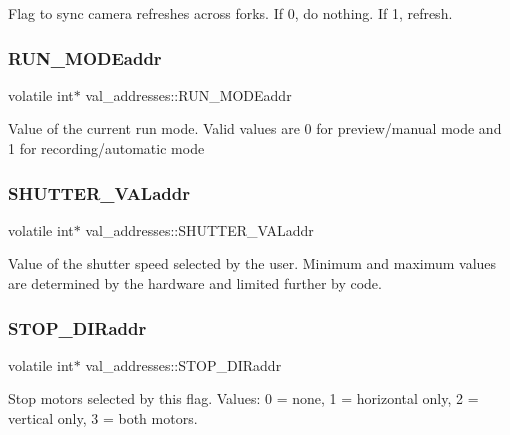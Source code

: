 Flag to sync camera refreshes across forks. If 0, do nothing. If 1, refresh. \mbox{\label{structval__addresses_aae5779146fa4fb188bb9572c20d5da4a}} 
\subsubsection{\texorpdfstring{R\+U\+N\+\_\+\+M\+O\+D\+Eaddr}{RUN\_MODEaddr}}
{\footnotesize\ttfamily volatile int$\ast$ val\+\_\+addresses\+::\+R\+U\+N\+\_\+\+M\+O\+D\+Eaddr}

Value of the current run mode. Valid values are 0 for preview/manual mode and 1 for recording/automatic mode \mbox{\label{structval__addresses_a57ee2cd54ae492b38aae06975b64b0e2}} 
\subsubsection{\texorpdfstring{S\+H\+U\+T\+T\+E\+R\+\_\+\+V\+A\+Laddr}{SHUTTER\_VALaddr}}
{\footnotesize\ttfamily volatile int$\ast$ val\+\_\+addresses\+::\+S\+H\+U\+T\+T\+E\+R\+\_\+\+V\+A\+Laddr}

Value of the shutter speed selected by the user. Minimum and maximum values are determined by the hardware and limited further by code. \mbox{\label{structval__addresses_ae9ae522d433f333dbb15a1ed5ebe70e6}} 
\subsubsection{\texorpdfstring{S\+T\+O\+P\+\_\+\+D\+I\+Raddr}{STOP\_DIRaddr}}
{\footnotesize\ttfamily volatile int$\ast$ val\+\_\+addresses\+::\+S\+T\+O\+P\+\_\+\+D\+I\+Raddr}

Stop motors selected by this flag. Values\+: 0 = none, 1 = horizontal only, 2 = vertical only, 3 = both motors. \mbox{\label{structval__addresses_a2dc7beaca139f55cee0def0170611e03}} 
